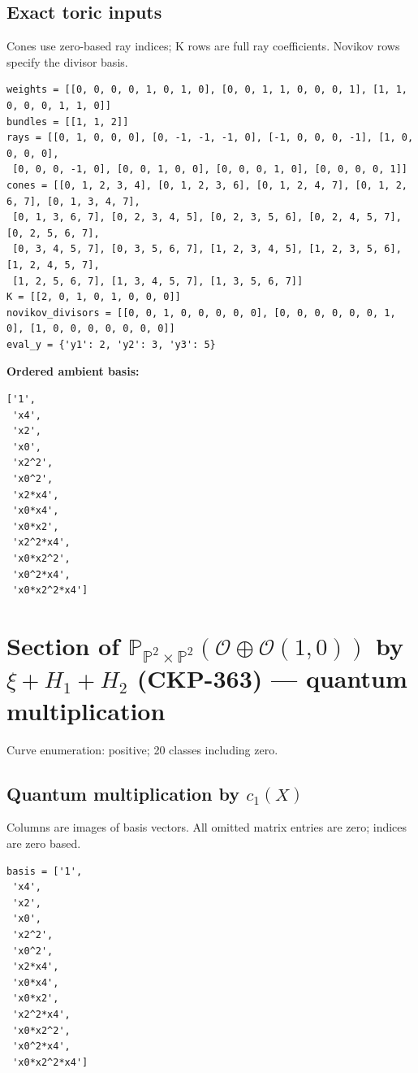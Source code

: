 \documentclass[10pt,a4paper]{article}
\begin{document}
\subsection*{Exact toric inputs}
Cones use zero-based ray indices; K rows are full ray coefficients. Novikov rows specify the divisor basis.

\begin{lstlisting}
weights = [[0, 0, 0, 0, 1, 0, 1, 0], [0, 0, 1, 1, 0, 0, 0, 1], [1, 1, 0, 0, 0, 1, 1, 0]]
bundles = [[1, 1, 2]]
rays = [[0, 1, 0, 0, 0], [0, -1, -1, -1, 0], [-1, 0, 0, 0, -1], [1, 0, 0, 0, 0],
 [0, 0, 0, -1, 0], [0, 0, 1, 0, 0], [0, 0, 0, 1, 0], [0, 0, 0, 0, 1]]
cones = [[0, 1, 2, 3, 4], [0, 1, 2, 3, 6], [0, 1, 2, 4, 7], [0, 1, 2, 6, 7], [0, 1, 3, 4, 7],
 [0, 1, 3, 6, 7], [0, 2, 3, 4, 5], [0, 2, 3, 5, 6], [0, 2, 4, 5, 7], [0, 2, 5, 6, 7],
 [0, 3, 4, 5, 7], [0, 3, 5, 6, 7], [1, 2, 3, 4, 5], [1, 2, 3, 5, 6], [1, 2, 4, 5, 7],
 [1, 2, 5, 6, 7], [1, 3, 4, 5, 7], [1, 3, 5, 6, 7]]
K = [[2, 0, 1, 0, 1, 0, 0, 0]]
novikov_divisors = [[0, 0, 1, 0, 0, 0, 0, 0], [0, 0, 0, 0, 0, 0, 1, 0], [1, 0, 0, 0, 0, 0, 0, 0]]
eval_y = {'y1': 2, 'y2': 3, 'y3': 5}
\end{lstlisting}

\textbf{Ordered ambient basis:}
\begin{lstlisting}
['1',
 'x4',
 'x2',
 'x0',
 'x2^2',
 'x0^2',
 'x2*x4',
 'x0*x4',
 'x0*x2',
 'x2^2*x4',
 'x0*x2^2',
 'x0^2*x4',
 'x0*x2^2*x4']
\end{lstlisting}

\clearpage\section*{Section of $\mathbb P_{\mathbb P^{2}\times \mathbb P^{2}}(\mathcal O\oplus \mathcal O(1,0))$ by $\xi +H_{1}+H_{2}$ (CKP-363) --- quantum multiplication}

Curve enumeration: positive; 20 classes including zero.
\subsection*{Quantum multiplication by $c_1(X)$}
Columns are images of basis vectors. All omitted matrix entries are zero; indices are zero based.

\begin{lstlisting}
basis = ['1',
 'x4',
 'x2',
 'x0',
 'x2^2',
 'x0^2',
 'x2*x4',
 'x0*x4',
 'x0*x2',
 'x2^2*x4',
 'x0*x2^2',
 'x0^2*x4',
 'x0*x2^2*x4']
\end{lstlisting}
\end{document}
